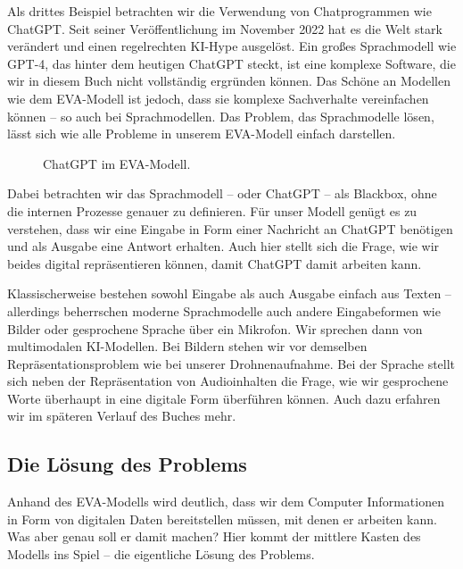 \documentclass[
  letterpaper,
  DIV=11]{scrreprt}
\begin{document}
Als drittes Beispiel betrachten wir die Verwendung von Chatprogrammen
wie ChatGPT. Seit seiner Veröffentlichung im November 2022 hat es die
Welt stark verändert und einen regelrechten KI-Hype ausgelöst. Ein
großes Sprachmodell wie GPT-4, das hinter dem heutigen ChatGPT steckt,
ist eine komplexe Software, die wir in diesem Buch nicht vollständig
ergründen können. Das Schöne an Modellen wie dem EVA-Modell ist jedoch,
dass sie komplexe Sachverhalte vereinfachen können -- so auch bei
Sprachmodellen. Das Problem, das Sprachmodelle lösen, lässt sich wie
alle Probleme in unserem EVA-Modell einfach darstellen.

\begin{figure}


\caption{\label{fig-eva-model-example-chatgpt}ChatGPT im EVA-Modell.}

\end{figure}%

Dabei betrachten wir das Sprachmodell -- oder ChatGPT -- als Blackbox,
ohne die internen Prozesse genauer zu definieren. Für unser Modell
genügt es zu verstehen, dass wir eine Eingabe in Form einer Nachricht an
ChatGPT benötigen und als Ausgabe eine Antwort erhalten. Auch hier
stellt sich die Frage, wie wir beides digital repräsentieren können,
damit ChatGPT damit arbeiten kann.

Klassischerweise bestehen sowohl Eingabe als auch Ausgabe einfach aus
Texten -- allerdings beherrschen moderne Sprachmodelle auch andere
Eingabeformen wie Bilder oder gesprochene Sprache über ein Mikrofon. Wir
sprechen dann von multimodalen KI-Modellen. Bei Bildern stehen wir vor
demselben Repräsentationsproblem wie bei unserer Drohnenaufnahme. Bei
der Sprache stellt sich neben der Repräsentation von Audioinhalten die
Frage, wie wir gesprochene Worte überhaupt in eine digitale Form
überführen können. Auch dazu erfahren wir im späteren Verlauf des Buches
mehr.

\subsection{Die Lösung des Problems}\label{die-luxf6sung-des-problems}

Anhand des EVA-Modells wird deutlich, dass wir dem Computer
Informationen in Form von digitalen Daten bereitstellen müssen, mit
denen er arbeiten kann. Was aber genau soll er damit machen? Hier kommt
der mittlere Kasten des Modells ins Spiel -- die eigentliche Lösung des
Problems.
\end{document}
